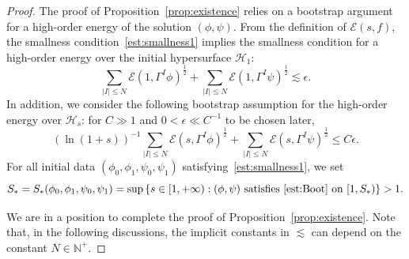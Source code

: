 \documentclass[10pt,a4paper]{amsart}
\begin{document}
\begin{proof}
 The proof of Proposition~\ref{prop:existence} relies on a bootstrap argument for a high-order energy of the solution $(\phi,\psi)$. From the definition of $\mathcal{E}(s,f)$, the smallness condition~\eqref{est:smallness1} implies the smallness condition for a high-order energy over the initial hypersurface $\mathcal{H}_{1}$:
\begin{equation}\label{est:smallness}
     \sum_{|I|\le N}\mathcal{E}(1,\Gamma^{I}\phi)^{\frac{1}{2}}+\sum_{|I|\le N}\mathcal{E}(1,\Gamma^{I}\psi)^{\frac{1}{2}}
     \lesssim \epsilon.
\end{equation}
In addition, we consider the following bootstrap assumption for the high-order energy over $\mathcal{H}_{s}$: for $C\gg 1$ and $0<\epsilon\ll C^{-1}$ to be chosen later, 
 \begin{equation}\label{est:Boot}
     (\ln(1+s))^{-1}\sum_{|I|\le N}\mathcal{E}(s,\Gamma^{I}\phi)^{\frac{1}{2}}+\sum_{|I|\le N}\mathcal{E}(s,\Gamma^{I}\psi)^{\frac{1}{2}}
     \leq C\epsilon.
 \end{equation}
 For all initial data $(\phi_{0},\phi_1,\psi_{0},\psi_1)$ satisfying~\eqref{est:smallness1}, we set 
\begin{equation*}
S_{*}=S_{*}(\phi_{0},\phi_1,\psi_{0},\psi_1)=\sup \left\{s\in [1,+\infty):(\phi,\psi) \ \mbox{satisfies}~\eqref{est:Boot}\ \mbox{on}\ [1,S_{*})\right\}>1.
\end{equation*}

We are in a position to complete the proof of 
Proposition~\ref{prop:existence}. Note that, in the following discussions, the implicit constants in $\lesssim$ can depend on the constant $N\in \mathbb{N}^{+}$.


\end{proof}
\end{document}
